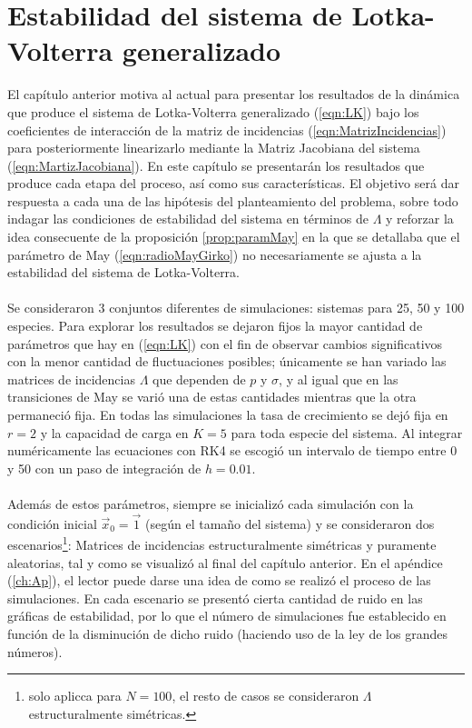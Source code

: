 \chapter{Estabilidad del sistema de Lotka-Volterra generalizado}

\setlength{\parindent}{0cm} El capítulo anterior motiva al actual para presentar los resultados de la dinámica que produce el sistema de Lotka-Volterra generalizado (\ref{eqn:LK}) bajo los coeficientes de interacción de la matriz de incidencias (\ref{eqn:MatrizIncidencias}) para posteriormente linearizarlo mediante la Matriz Jacobiana del sistema (\ref{eqn:MartizJacobiana}). En este capítulo se presentarán los resultados que produce cada etapa del proceso, así como sus características. El objetivo será dar respuesta a cada una de las hipótesis del planteamiento del problema, sobre todo indagar las condiciones de estabilidad del sistema en términos de $\Lambda$ y reforzar la idea consecuente de la proposición \ref{prop:paramMay} en la que se detallaba que el parámetro de May (\ref{eqn:radioMayGirko}) no necesariamente se ajusta a la estabilidad del sistema de Lotka-Volterra.\\
\\
Se consideraron 3 conjuntos diferentes de simulaciones: sistemas para 25, 50 y 100 especies. Para explorar los resultados se dejaron fijos la mayor cantidad de parámetros que hay en (\ref{eqn:LK}) con el fin de observar cambios significativos con la menor cantidad de fluctuaciones posibles; únicamente se han variado las matrices de incidencias $\Lambda$ que dependen de $p$ y $\sigma$, y al igual que en las transiciones de May se varió una de estas cantidades mientras que la otra permaneció fija. En todas las simulaciones la tasa de crecimiento se dejó fija en $r=2$ y la capacidad de carga en $K=5$ para toda especie del sistema. Al integrar numéricamente las ecuaciones con RK4 se escogió un intervalo de tiempo entre 0 y 50 con un paso de integración de $h=0.01$.\\
\\
Además de estos parámetros, siempre se inicializó cada simulación con la condición inicial $\vec{x}_0=\vec{1}$ (según el tamaño del sistema) y se consideraron dos escenarios\footnote{solo aplicca para $N=100$, el resto de casos se consideraron $\Lambda$ estructuralmente simétricas.}: Matrices de incidencias estructuralmente simétricas y puramente aleatorias, tal y como se visualizó al final del capítulo anterior. En el apéndice (\ref{ch:Ap}), el lector puede darse una idea de como se realizó el proceso de las simulaciones. En cada escenario se presentó cierta cantidad de ruido en las gráficas de estabilidad, por lo que el número de simulaciones fue establecido en función de la disminución de dicho ruido (haciendo uso de la ley de los grandes números).

